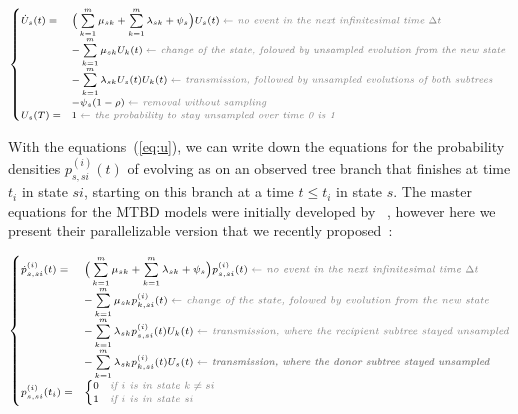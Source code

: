 \documentclass[a4paper,10pt]{article}
\begin{document}
\begin{equation}
\scriptsize
\begin{cases}
\dot{U}_{s}(t) = &\Big(\sum\limits_{k=1}^{m} \mu_{sk} + \sum\limits_{k=1}^{m} \lambda_{sk} + \psi_s\Big) U_{s}(t)\; \textit{\color{gray} $\leftarrow$ no event in the next infinitesimal time $\Delta t$ }\\ 
    & - \sum\limits_{k=1}^{m} \mu_{sk} U_{k}(t)\;  \textit{\color{gray} $\leftarrow$ change of the state, folowed by unsampled evolution from the new state }\\
    &- \sum\limits_{k=1}^{m} \lambda_{sk} U_{s}(t)U_{k}(t) \;  \textit{\color{gray} $\leftarrow$ transmission, followed by unsampled evolutions of both subtrees}\\
    &- \psi_s (1 - \rho)\;  \textit{\color{gray} $\leftarrow$ removal without sampling}\\
U_{s}(T) = & 1\;  \textit{\color{gray} $\leftarrow$ the probability to stay unsampled over time 0 is 1} \label{eq:u}
\end{cases}
\end{equation}


With the equations~(\ref{eq:u}), we can write down the equations for the probability densities $p_{s,si}^{(i)}(t)$ of evolving as on an observed tree branch that finishes at time $t_i$ in state $si$, starting  on this branch at a time $t \leq t_i$ in state $s$. The master equations for the MTBD models were initially developed by ~\citet{Stadler2013a}, however here we present their parallelizable version that we recently proposed~\cite{zhukovaFastAccurateMaximumLikelihood2022}:

\begin{equation}
\scriptsize
\begin{cases}
\dot{p}_{s,si}^{(i)}(t) = & \Big(\sum\limits_{k=1}^{m} \mu_{sk} + \sum\limits_{k=1}^{m} \lambda_{sk} + \psi_s\Big) p_{s,si}^{(i)}(t)\; \textit{\color{gray} $\leftarrow$ no event in the next infinitesimal time $\Delta t$ }\\
    & - \sum\limits_{k=1}^{m} \mu_{sk} p_{k,si}^{(i)}(t)\;  \textit{\color{gray} $\leftarrow$ change of the state, folowed by evolution from the new state }\\
    & - \sum\limits_{k=1}^{m} \lambda_{sk} p_{s,si}^{(i)}(t)U_{k}(t)\;  \textit{\color{gray} $\leftarrow$ transmission, where the recipient subtree stayed unsampled}\\
    & - \sum\limits_{k=1}^{m} \lambda_{sk} p_{k,si}^{(i)}(t)U_{s}(t)\;  \textbf{\textit{\color{gray} $\leftarrow$ transmission, where the donor subtree stayed unsampled}}\\
p_{s,si}^{(i)}(t_i) = & 
    \begin{cases}
    0 & \textit{\color{gray} if $i$ is in state $k \neq si$}\\
    1 & \textit{\color{gray} if $i$ is in state $si$}
    \end{cases}\label{eq:p}
\end{cases}
\end{equation}
\end{document}
